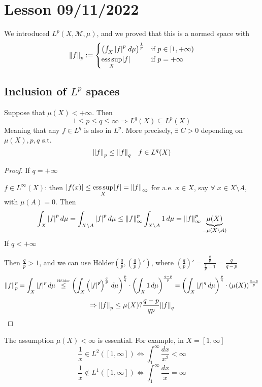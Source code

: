 \section{Lesson 09/11/2022}
We introduced \(L^p(X, \mathcal{M}, \mu)\), and we proved that this is a normed space with 
\[
    \norm{f}_p := \begin{cases}
        \left( \int_X \abs{f}^p \; d\mu \right)^{\frac{1}{p}} & \text{if } p\in [1, +\infty) \\
        \underset{X}{\text{ess}\, \text{sup}}\abs{f} & \text{if } p = +\infty
    \end{cases}
\]
\subsection*{Inclusion of \(L^p\) spaces}
\begin{theorem}
    Suppose that \(\mu(X) < +\infty\). Then 
    \[
        1 \leq p \leq q \leq \infty \Rightarrow L^q(X) \subseteq L^p(X)
    \]
    Meaning that any \(f \in L^q\) is also in \(L^p\). More precisely, \(\exists \; C > 0\) depending on \(\mu(X), p, q\) s.t.
    \[
        \norm{f}_p \leq \norm{f}_q \quad f \in L^q(X)
    \]
\end{theorem}
\begin{proof}
    If \(q = +\infty\)
    
    \(f \in L^\infty(X)\): then \(\abs{f(x)} \leq \underset{X}{\text{ess}\, \text{sup}}\abs{f} = \norm{f}_\infty\) for a.e. \(x \in X\), say \(\forall \; x \in X \setminus A\), with \(\mu(A) = 0\). Then 
    \[
        \int_X \abs{f}^p \, d\mu = \int_{X\setminus A} \abs{f}^p \, d\mu \leq \norm{f}_{\infty}^p \int_{X\setminus A} 1 \,d\mu = \norm{f}_\infty^p \underbrace{\mu(X)}_{= \mu(X\setminus A)}
    \]
    If \(q < +\infty\)

    Then \(\frac{q}{p} > 1\), and we can use Hölder\(\left(\frac{q}{p},\left( \frac{q}{p} \right)' \right)\), where \(\left( \frac{q}{p} \right)' = \frac{\frac{q}{p}}{\frac{q}{p}-1} = \frac{q}{q-p}\)
    \[
        \norm{f}_p^p = \int_X \abs{f}^p \, d\mu \overset{\text{\tiny{Hölder}}}{\leq} \left( \int_X \left( \abs{f}^{\not p} \right)^{\frac{q}{\not p}} \, d\mu\right)^{\frac{p}{q}}\cdot \left( \int_X 1 \, d\mu \right)^{\frac{q-p}{p}} = \left( \int_X \abs{f}^{q} \, d\mu\right)^{\frac{p}{q}}\cdot \left( \mu(X)\right)^{\frac{q-p}{p}}
    \]
    \[
        \Rightarrow \norm{f}_p \leq \mu(X)?{\frac{q-p}{qp}} \norm{f}_q
    \]
\end{proof}

The assumption \(\mu(X)< \infty\) is essential. For example, in \(X = [1, \infty]\)
\[
    \frac{1}{x} \in L^2([1, \infty]) \iff \int_1^\infty \frac{dx}{x^2} < \infty
\]
\[
    \frac{1}{x} \notin L^1 ([1, \infty]) \iff \int_1^\infty \frac{dx}{x} = \infty
\]

